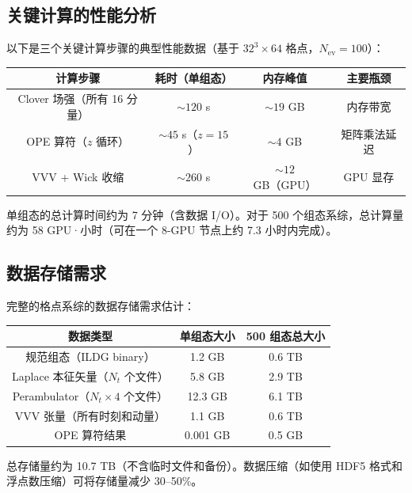 \documentclass[11pt,a4paper]{ctexart}
\begin{document}
\subsection{关键计算的性能分析}

以下是三个关键计算步骤的典型性能数据（基于 $32^3\times 64$ 格点，$N_{\text{ev}}=100$）：

\begin{center}
\begin{tabular}{c c c c}
\toprule
\textbf{计算步骤} & \textbf{耗时（单组态）} & \textbf{内存峰值} & \textbf{主要瓶颈} \\
\midrule
Clover 场强（所有 16 分量） & $\sim 120$ s & $\sim 19$ GB & 内存带宽 \\
OPE 算符（$z$ 循环） & $\sim 45$ s（$z=15$） & $\sim 4$ GB & 矩阵乘法延迟 \\
VVV + Wick 收缩 & $\sim 260$ s & $\sim 12$ GB（GPU） & GPU 显存 \\
\bottomrule
\end{tabular}
\end{center}

单组态的总计算时间约为 7 分钟（含数据 I/O）。对于 500 个组态系综，总计算量约为 58 GPU·小时（可在一个 8-GPU 节点上约 7.3 小时内完成）。

\subsection{数据存储需求}

完整的格点系综的数据存储需求估计：

\begin{center}
\begin{tabular}{c c c}
\toprule
\textbf{数据类型} & \textbf{单组态大小} & \textbf{500 组态总大小} \\
\midrule
规范组态（ILDG binary） & 1.2 GB & 0.6 TB \\
Laplace 本征矢量（$N_t$ 个文件） & 5.8 GB & 2.9 TB \\
Perambulator（$N_t \times 4$ 个文件） & 12.3 GB & 6.1 TB \\
VVV 张量（所有时刻和动量） & 1.1 GB & 0.6 TB \\
OPE 算符结果 & 0.001 GB & 0.5 GB \\
\bottomrule
\end{tabular}
\end{center}

总存储量约为 10.7 TB（不含临时文件和备份）。数据压缩（如使用 HDF5 格式和浮点数压缩）可将存储量减少 30--50\%。
\end{document}
